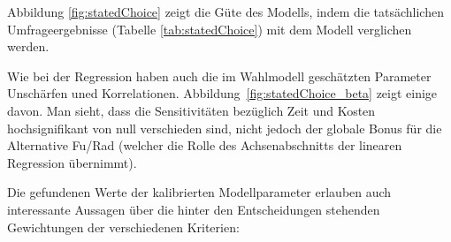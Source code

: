 Abbildung \ref{fig:statedChoice} zeigt die G\"ute des Modells, indem
die tats\"achlichen Umfrageergebnisse (Tabelle \ref{tab:statedChoice})
 mit dem Modell 
 verglichen werden.


Wie bei der Regression haben auch die im Wahlmodell gesch\"atzten
Parameter Unsch\"arfen uned
Korrelationen. Abbildung~\ref{fig:statedChoice_beta} zeigt einige
davon. Man sieht, dass die Sensitivit\"aten bez\"uglich Zeit und
Kosten hochsignifikant von null verschieden sind, nicht jedoch der
globale Bonus f\"ur die Alternative Fu\3/Rad (welcher die Rolle des Achsenabschnitts der
linearen Regression \"ubernimmt).


Die gefundenen Werte der kalibrierten Modellparameter erlauben
auch interessante Aussagen \"uber die hinter den Entscheidungen
stehenden Gewichtungen der verschiedenen Kriterien:

